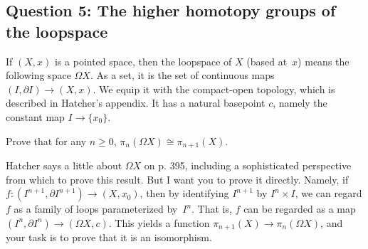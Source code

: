 \subsection{Question 5: The higher homotopy groups of the loopspace}
\begin{prob}
    If $(X,x)$ is a pointed space, then the loopspace of $X$ (based at~$x$) means the following space $\Omega X$.  As a set, it is the set of continuous maps $(I,\partial I)\to(X,x)$.  We equip it with the compact-open topology, which is described in Hatcher's appendix.  It has a natural basepoint $c$, namely the constant map $I\to\{x_0\}$. 

    Prove that for any $n\geq0$, $\pi_n(\Omega X)\cong\pi_{n+1}(X)$.

    Hatcher says a little about $\Omega X$ on p. 395, including a sophisticated perspective from which to prove this result.  But I want you to prove it directly.  Namely, if $f:(I^{n+1},\partial I^{n+1})\to (X,x_0)$, then by identifying $I^{n+1}$ by $I^n\times I$, we can regard $f$ as a family of loops parameterized by~$I^n$.  That is, $f$ can be regarded as a map $(I^n,\partial I^{n})\to(\Omega X,c)$.  This yields a function $\pi_{n+1}(X)\to \pi_n(\Omega X)$, and your task is to prove that it is an isomorphism.
\end{prob}
